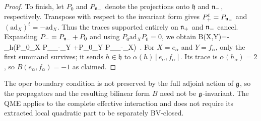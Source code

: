 \documentclass[11pt]{amsart}
\numberwithin{equation}{section}
\numberwithin{figure}{section}
\numberwithin{table}{section}
\begin{document}
\begin{proof}
	To finish, let $P_0$ and $P_{\mathfrak{n}_-}$ denote the projections onto $\mathfrak{h}$ and $\mathfrak{n}_-$, respectively.
	Transpose with respect to the invariant form gives $P_+^t=P_{\mathfrak{n}_-}$ and $(\mathrm{ad}_X)^t=-\mathrm{ad}_X$.
	Thus the traces supported entirely on $\mathfrak{n}_+$ and $\mathfrak{n}_-$ cancel.
	Expanding $P_-=P_{\mathfrak{n}_-}+P_0$ and using $P_0\mathrm{ad}_X P_0=0$, we obtain
	\be
	 B(X,Y)=-\Tr_{\mathfrak h}\big(P_0_X P_{\fn_-}_Y
	                  +P_0_Y P_{\fn_-}_X\big)~.
	\ee
	For $X=e_\alpha$ and $Y=f_\alpha$, only the first summand survives; it sends $h\in\mathfrak h$ to $\alpha(h)[e_\alpha,f_\alpha]$.
	Its trace is $\alpha(h_\alpha)=2$, so $B(e_\alpha,f_\alpha)=-1$ as claimed.
\end{proof}

\begin{rmk}\label{rmk:OperPolarization}
The oper boundary condition is not preserved by the full adjoint action of $\mathfrak{g}$, so the propagators and the resulting bilinear form $B$ need not be $\mathfrak{g}$-invariant.
The QME applies to the complete effective interaction and does not require its extracted local quadratic part to be separately BV-closed.
\end{rmk}
\end{document}
